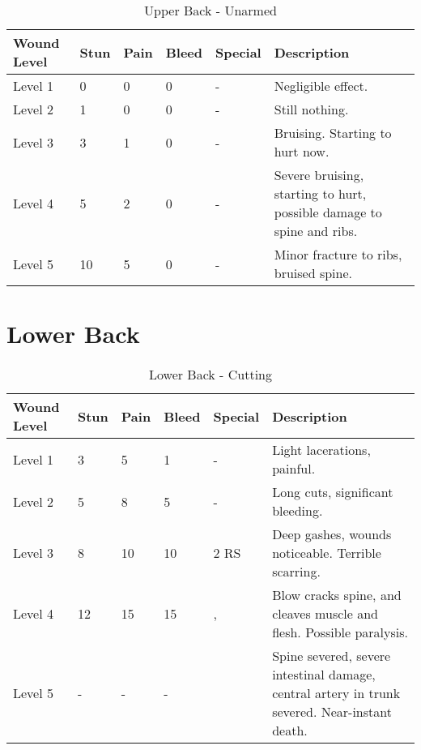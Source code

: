 \documentclass[oneside,11pt,english]{book}
\begin{document}
\begin{table}[!hb] %
	\caption{Upper Back - Unarmed}
	\label{wound:Upper Back - Unarmed}
	\begin{tabu} to 
		Wound Level &Stun &Pain &Bleed &Special &Description\\\toprule
		Level 1& 0& 0& 0& - &Negligible effect.\\
		Level 2& 1& 0& 0& - &Still nothing.\\
		Level 3& 3& 1& 0& - &Bruising. Starting to hurt now.\\
		Level 4& 5& 2& 0& - &Severe bruising, starting to hurt, possible damage to spine and ribs.\\
		Level 5& 10& 5& 0& - &Minor fracture to ribs, bruised spine.\\
	\end{tabu}
\end{table}
\clearpage

\section{Lower Back} \vspace{-25pt} \label{sec:lower-back}
\begin{table}[!hb] %
	\caption{Lower Back - Cutting}
	\label{wound:Lower Back - Cutting}
	\begin{tabu} to 
		Wound Level &Stun &Pain &Bleed &Special &Description\\\toprule
		Level 1& 3& 5& 1& - &Light lacerations, painful.\\
		Level 2& 5& 8& 5& - &Long cuts, significant bleeding.\\
		Level 3& 8& 10& 10&  2 RS &Deep gashes, wounds noticeable. Terrible scarring.\\
		Level 4& 12& 15& 15
		&, 
		&Blow cracks spine, and cleaves muscle and flesh. Possible paralysis.\\
		Level 5& - &- &- & &Spine severed, severe intestinal damage, central artery in trunk severed. Near-instant death.\\
	\end{tabu}
\end{table}
\end{document}
